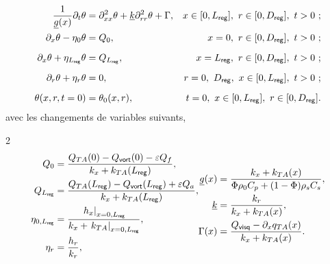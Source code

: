 \begin{subequations}
	\begin{align}
		\frac{1}{\underline g(x)} \partial_t \theta &= \partial_{xx}^2 \theta + \underline k \partial_{rr}^2 \theta + \Gamma, & x \in [0,L_{\sf reg}],\ r \in [0,D_{\sf reg}],\ t>0\ ; \label{eq:BilanThermique_ChgtVariables} \\
		\partial_x \theta - \eta_0 \theta &= Q_0, & x=0,\ r \in [0,D_{\sf reg}],\ t>0\ ; \label{eq:CondFront_x_0Froid_ChgtVariables} \\[6pt]
		\partial_x \theta + \eta_{L_{\sf reg}} \theta &= Q_{L_{\sf reg}}, & x=L_{\sf reg},\ r \in [0,D_{\sf reg}],\ t>0\ ; \label{eq:CondFront_x_LregAmb_ChgtVariables} \\[6pt]
		\partial_r \theta + \eta_r \theta &= 0, & r=0,\ D_{\sf reg},\ x \in [0,L_{\sf reg}],\ t>0\ ; \label{eq:CondFront_r_Rreg_ChgtVariables} \\[6pt]
		\theta(x,r,t=0) &= \theta_0(x,r), & t=0,\ x \in [0,L_{\sf reg}],\ r \in [0,D_{\sf reg}].	\label{eq:CondInit_ChgtVariables}
	\end{align}	
	\label{eq:ProblemeTransitoire_ChgtVariables}
\end{subequations}
avec les changements de variables suivants,

\begin{multicols}{2}
	\begin{subequations}
		\begin{align}
			Q_0 &= \frac{Q_{TA}(0)-Q_{\sf vort}(0)-\epsilon Q_f}{k_x+k_{TA}(L_{\sf reg})}, \\
			Q_{L_{\sf reg}} &= \frac{Q_{TA}(L_{\sf reg})-Q_{\sf vort}(L_{\sf reg})+\epsilon Q_a}{k_x+k_{TA}(L_{\sf reg})},\\
			\eta_{0,L_{\sf reg}} &= \frac{\left.h_x\right|_{x=0,L_{\sf reg}}}{k_x + \left.k_{TA}\right|_{x=0,L_{\sf reg}}}, \\
			\eta_r &= \frac{h_r}{k_r},
		\end{align}
		
		\begin{align}
			\underline g(x) &= \frac{k_x + k_{TA}(x)}{\Phi \rho_0 C_p + (1-\Phi) \rho_s C_s}, \\
			\underline k &= \frac{k_r}{k_x + k_{TA}(x)}, \\
			\Gamma(x) &= \frac{Q_{\sf visq}-\partial_x q_{TA}(x)}{k_x + k_{TA}(x)}.
		\end{align}
		\label{eq:}
	\end{subequations}
\end{multicols}

